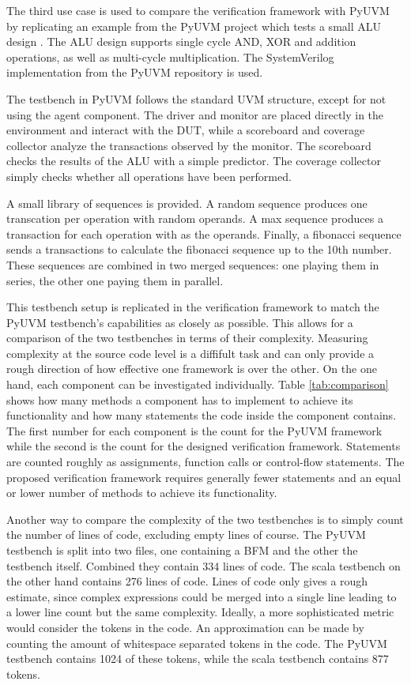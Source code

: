 The third use case is used to compare the verification framework with PyUVM by replicating an example from the PyUVM
project which tests a small ALU design \cite{pyuvm_tinyalu}. The ALU design supports single cycle AND, XOR and
addition operations, as well as multi-cycle multiplication. The SystemVerilog implementation from the PyUVM repository is used.

The testbench in PyUVM follows the standard UVM structure, except for not using the agent component. The driver and
monitor are placed directly in the environment and interact with the DUT, while a scoreboard and coverage collector
analyze the transactions observed by the monitor. The scoreboard checks the results of the ALU with a simple
predictor. The coverage collector simply checks whether all operations have been performed.

A small library of sequences is provided. A random sequence produces one transcation per operation with random
operands. A max sequence produces a transaction for each operation with  as the operands. Finally, a
fibonacci sequence sends a transactions to calculate the fibonacci sequence up to the 10th number. These sequences
are combined in two merged sequences: one playing them in series, the other one paying them in parallel.

This testbench setup is replicated in the verification framework to match the PyUVM testbench's capabilities as
closely as possible. This allows for a comparison of the two testbenches in terms of their complexity. Measuring
complexity at the source code level is a diffifult task and can only provide a rough direction of how effective one
framework is over the other. On the one hand, each component can be investigated individually. Table
\ref{tab:comparison} shows how many methods a component has to implement to achieve its functionality and how many
statements the code inside the component contains. The first number for each component is the count for the PyUVM
framework while the second is the count for the designed verification framework. Statements are counted roughly as
assignments, function calls or control-flow statements. The proposed verification framework requires generally fewer
statements and an equal or lower number of methods to achieve its functionality.

Another way to compare the complexity of the two testbenches is to simply count the number of lines of code,
excluding empty lines of course. The PyUVM testbench is split into two files, one containing a BFM and the other the
testbench itself. Combined they contain 334 lines of code. The scala testbench on the other hand contains 276 lines
of code. Lines of code only gives a rough estimate, since complex expressions could be merged into a single line
leading to a lower line count but the same complexity. Ideally, a more sophisticated metric would consider the tokens
in the code. An approximation can be made by counting the amount of whitespace separated tokens in the code. The
PyUVM testbench contains 1024 of these tokens, while the scala testbench contains 877 tokens.

